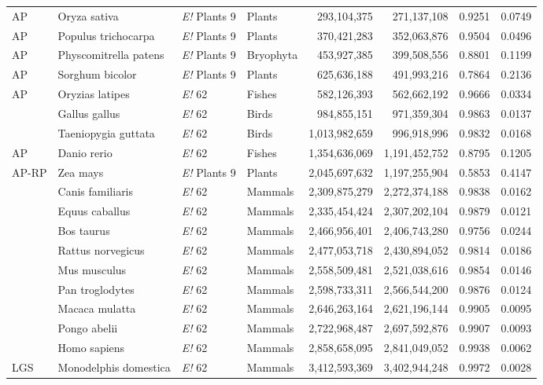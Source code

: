 \begin{table}[htbp]
{\begin{tabular}{ l l p{62pt} l r r r r }
AP & Oryza sativa & {\it E!} Plants 9 & Plants & 293,104,375 & 271,137,108 & 0.9251 & 0.0749 \\
AP & Populus trichocarpa & {\it E!} Plants 9 & Plants & 370,421,283 & 352,063,876 & 0.9504 & 0.0496 \\
AP & Physcomitrella patens & {\it E!} Plants 9 & Bryophyta & 453,927,385 & 399,508,556 & 0.8801 & 0.1199 \\
AP & Sorghum bicolor & {\it E!} Plants 9 & Plants & 625,636,188 & 491,993,216 & 0.7864 & 0.2136 \\
AP & Oryzias latipes & {\it E!} 62 & Fishes & 582,126,393 & 562,662,192 & 0.9666 & 0.0334 \\
 & Gallus gallus & {\it E!} 62 & Birds & 984,855,151 & 971,359,304 & 0.9863 & 0.0137 \\
 & Taeniopygia guttata & {\it E!} 62 & Birds & 1,013,982,659 & 996,918,996 & 0.9832 & 0.0168 \\
AP & Danio rerio & {\it E!} 62 & Fishes & 1,354,636,069 & 1,191,452,752 & 0.8795 & 0.1205 \\
AP-RP & Zea mays & {\it E!} Plants 9 & Plants & 2,045,697,632 & 1,197,255,904 & 0.5853 & 0.4147 \\
 & Canis familiaris & {\it E!} 62 & Mammals & 2,309,875,279 & 2,272,374,188 & 0.9838 & 0.0162 \\
 & Equus caballus & {\it E!} 62 & Mammals & 2,335,454,424 & 2,307,202,104 & 0.9879 & 0.0121 \\
 & Bos taurus & {\it E!} 62 & Mammals & 2,466,956,401 & 2,406,743,280 & 0.9756 & 0.0244 \\
 & Rattus norvegicus & {\it E!} 62 & Mammals & 2,477,053,718 & 2,430,894,052 & 0.9814 & 0.0186 \\
 & Mus musculus & {\it E!} 62 & Mammals & 2,558,509,481 & 2,521,038,616 & 0.9854 & 0.0146 \\
 & Pan troglodytes & {\it E!} 62 & Mammals & 2,598,733,311 & 2,566,544,200 & 0.9876 & 0.0124 \\
 & Macaca mulatta & {\it E!} 62 & Mammals & 2,646,263,164 & 2,621,196,144 & 0.9905 & 0.0095 \\
 & Pongo abelii & {\it E!} 62 & Mammals & 2,722,968,487 & 2,697,592,876 & 0.9907 & 0.0093 \\
 & Homo sapiens & {\it E!} 62 & Mammals & 2,858,658,095 &
 2,841,049,052 & 0.9938 & 0.0062 \\
LGS & Monodelphis domestica & {\it E!} 62 & Mammals & 3,412,593,369 & 3,402,944,248 & 0.9972 & 0.0028 \\ \hline
  \end{tabular}
}
\end{table}
